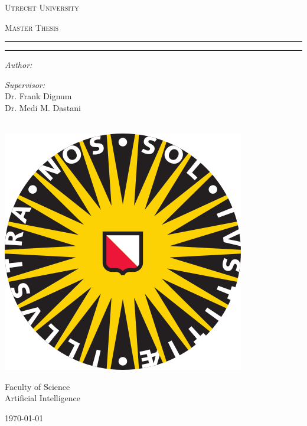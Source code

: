 \makeatletter
\begin{titlepage}
\begin{center}

\vspace*{.06\textheight}
{\scshape\LARGE Utrecht University\par}\vspace{1.5cm} %
\textsc{\Large Master Thesis}\\[0.5cm] %

\hrule
\vspace{0.2cm}
{\huge \bfseries \@title \par}
\vspace{0.4cm} %
\hrule
\vspace{0.2cm}

\begin{minipage}[t]{0.4\textwidth}
\begin{flushleft} \large
\emph{Author:}\\
\@author %
\end{flushleft}
\end{minipage}
\begin{minipage}[t]{0.4\textwidth}
\begin{flushright} \large
\emph{Supervisor:} \\
Dr. Frank Dignum \\
Dr. Medi M. Dastani
\end{flushright}
\end{minipage}\\[3cm]
 
\includegraphics{logo} %
\vfill

Faculty of Science \\
Artificial Intelligence\\[2cm] %
 
\vfill

{\large \today}\\[4cm] %
 
\vfill
\end{center}
\end{titlepage}
\makeatother